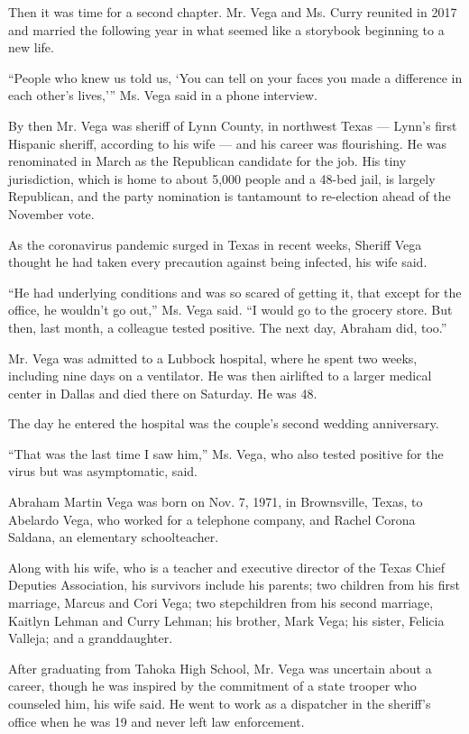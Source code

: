 Then it was time for a second chapter. Mr. Vega and Ms. Curry reunited
in 2017 and married the following year in what seemed like a storybook
beginning to a new life.

``People who knew us told us, `You can tell on your faces you made a
difference in each other's lives,''' Ms. Vega said in a phone interview.

By then Mr. Vega was sheriff of Lynn County, in northwest Texas ---
Lynn's first Hispanic sheriff, according to his wife --- and his career
was flourishing. He was renominated in March as the Republican candidate
for the job. His tiny jurisdiction, which is home to about 5,000 people
and a 48-bed jail, is largely Republican, and the party nomination is
tantamount to re-election ahead of the November vote.

As the coronavirus pandemic surged in Texas in recent weeks, Sheriff
Vega thought he had taken every precaution against being infected, his
wife said.

``He had underlying conditions and was so scared of getting it, that
except for the office, he wouldn't go out,'' Ms. Vega said. ``I would go
to the grocery store. But then, last month, a colleague tested positive.
The next day, Abraham did, too.''

Mr. Vega was admitted to a Lubbock hospital, where he spent two weeks,
including nine days on a ventilator. He was then airlifted to a larger
medical center in Dallas and died there on Saturday. He was 48.

The day he entered the hospital was the couple's second wedding
anniversary.

``That was the last time I saw him,'' Ms. Vega, who also tested positive
for the virus but was asymptomatic, said.

Abraham Martin Vega was born on Nov. 7, 1971, in Brownsville, Texas, to
Abelardo Vega, who worked for a telephone company, and Rachel Corona
Saldana, an elementary schoolteacher.

Along with his wife, who is a teacher and executive director of the
Texas Chief Deputies Association, his survivors include his parents; two
children from his first marriage, Marcus and Cori Vega; two stepchildren
from his second marriage, Kaitlyn Lehman and Curry Lehman; his brother,
Mark Vega; his sister, Felicia Valleja; and a granddaughter.

After graduating from Tahoka High School, Mr. Vega was uncertain about a
career, though he was inspired by the commitment of a state trooper who
counseled him, his wife said. He went to work as a dispatcher in the
sheriff's office when he was 19 and never left law enforcement.

